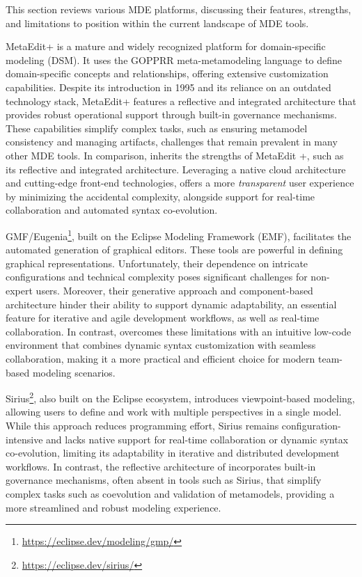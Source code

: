 This section reviews various MDE platforms, discussing their features, strengths, and limitations to position \jjodel{} within the current landscape of MDE tools.

MetaEdit+ \cite{Kelly2013} is a mature and widely recognized platform for domain-specific modeling (DSM). It uses the GOPPRR meta-metamodeling language \cite{kelly2005domain} to define domain-specific concepts and relationships, offering extensive customization capabilities. Despite its introduction in 1995 and its reliance on an outdated technology stack, MetaEdit+ features a reflective and integrated architecture that provides robust operational support through built-in governance mechanisms. These capabilities simplify complex tasks, such as ensuring metamodel consistency and managing artifacts, challenges that remain prevalent in many other MDE tools.
%
In comparison, \jjodel{} inherits the strengths of MetaEdit +, such as its reflective and integrated architecture. Leveraging a native cloud architecture and cutting-edge front-end technologies, \jjodel{} offers a more \textit{transparent} user experience by minimizing the accidental complexity, alongside support for real-time collaboration and automated syntax co-evolution. 

GMF/Eugenia\footnote{\url{https://eclipse.dev/modeling/gmp/}}, built on the Eclipse Modeling Framework (EMF), facilitates the automated generation of graphical editors. These tools are powerful in defining graphical representations. Unfortunately, their dependence on intricate configurations and technical complexity poses significant challenges for non-expert users. Moreover, their generative approach and component-based architecture hinder their ability to support dynamic adaptability, an essential feature for iterative and agile development workflows, as well as real-time collaboration. In contrast, \jjodel{} overcomes these limitations with an intuitive low-code environment that combines dynamic syntax customization with seamless collaboration, making it a more practical and efficient choice for modern team-based modeling scenarios.

Sirius\footnote{\url{https://eclipse.dev/sirius/}}, also built on the Eclipse ecosystem, introduces viewpoint-based modeling, allowing users to define and work with multiple perspectives in a single model. While this approach reduces programming effort, Sirius remains configuration-intensive and lacks native support for real-time collaboration or dynamic syntax co-evolution, limiting its adaptability in iterative and distributed development workflows. In contrast, the reflective architecture of \jjodel{} incorporates built-in governance mechanisms, often absent in tools such as Sirius, that simplify complex tasks such as coevolution and validation of metamodels, providing a more streamlined and robust modeling experience.

